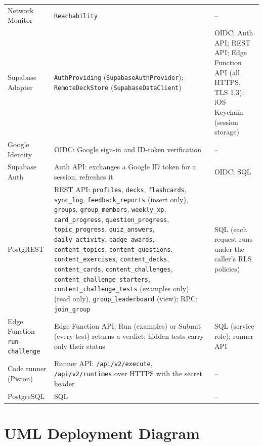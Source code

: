 \documentclass[12pt,letterpaper]{article}
\begin{document}
\begin{xltabular}{\textwidth}{@{}L{2.8cm} Y Y@{}}
Network Monitor & \texttt{Reachability} & -- \\
Supabase Adapter & \texttt{AuthProviding} (\texttt{SupabaseAuthProvider}); \texttt{RemoteDeckStore} (\texttt{SupabaseDataClient}) & OIDC; Auth API; REST API; Edge Function API (all HTTPS, TLS 1.3); iOS Keychain (session storage) \\
Google Identity & OIDC: Google sign-in and ID-token verification & -- \\
Supabase Auth & Auth API: exchanges a Google ID token for a session, refreshes it & OIDC; SQL \\
PostgREST & REST API: \texttt{profiles}, \texttt{decks}, \texttt{flashcards}, \texttt{sync\_log}, \texttt{feedback\_reports} (insert only), \texttt{groups}, \texttt{group\_members}, \texttt{weekly\_xp}, \texttt{card\_progress}, \texttt{question\_progress}, \texttt{topic\_progress}, \texttt{quiz\_answers}, \texttt{daily\_activity}, \texttt{badge\_awards}, \texttt{content\_topics}, \texttt{content\_questions}, \texttt{content\_exercises}, \texttt{content\_decks}, \texttt{content\_cards}, \texttt{content\_challenges}, \texttt{content\_challenge\_starters}, \texttt{content\_challenge\_tests} (examples only) (read only), \texttt{group\_leaderboard} (view); RPC: \texttt{join\_group} & SQL (each request runs under the caller's RLS policies) \\
Edge Function \texttt{run-challenge} & Edge Function API: Run (examples) or Submit (every test) returns a verdict; hidden tests carry only their status & SQL (service role); runner API \\
Code runner (Piston) & Runner API: \texttt{/api/v2/execute}, \texttt{/api/v2/runtimes} over HTTPS with the secret header & -- \\
PostgreSQL & SQL & -- \\
\end{xltabular}

\section{UML Deployment Diagram}\label{sec:deploy}
\end{document}
